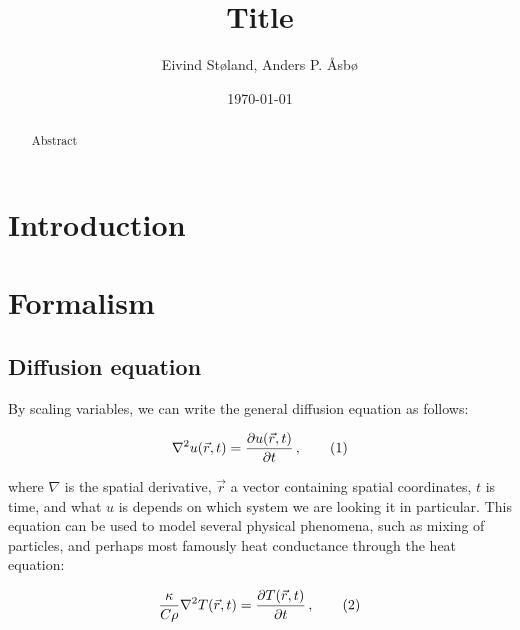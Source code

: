 \documentclass[reprint,english,notitlepage]{revtex4-1}  %
\newcommand\numberthis{\addtocounter{equation}{1}\tag{\theequation}}
\begin{document}
\title{Title}   %
\author{Eivind Støland, Anders P. Åsbø}               %
\date{\today}                             %
\noaffiliation                            %

\begin{abstract}
Abstract
\end{abstract}

\maketitle                                %


\tableofcontents

\section{Introduction} \label{sec:introduction}


\clearpage

\section{Formalism} \label{sec:formalism}

\subsection{Diffusion equation} \label{sec:formalism_diffusion_equation}

By scaling variables, we can write the general diffusion equation as follows:

\begin{align*}
\nabla^2 u(\vec{r},t) = \frac{\partial u(\vec{r},t)}{\partial t} \, , \numberthis \label{eq:3D_diff_eq}
\end{align*}

where $\nabla$ is the spatial derivative, $\vec{r}$ a vector containing spatial coordinates, $t$ is time, and what $u$ is depends on which system we are looking it in particular. This equation can be used to model several physical phenomena, such as mixing of particles, and perhaps most famously heat conductance through the heat equation:

\begin{align*}
\frac{\kappa}{C \rho} \nabla^2 T(\vec{r},t) = \frac{\partial T (\vec{r},t)}{\partial t} \, , \numberthis \label{eq:heat_equation_general}
\end{align*}
\end{document}
